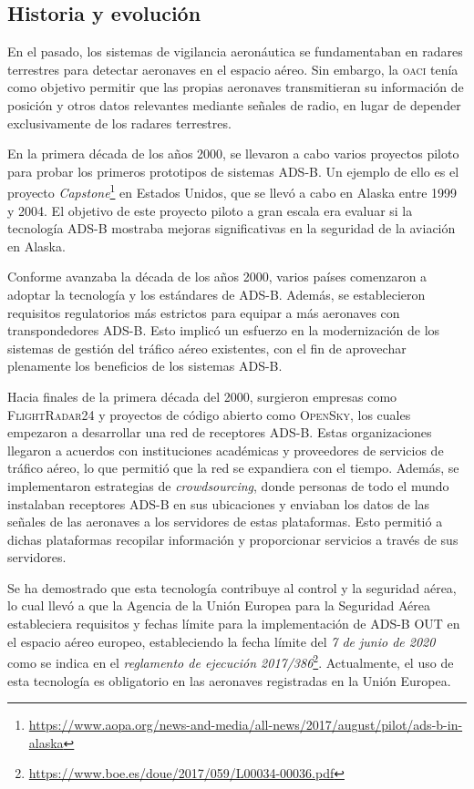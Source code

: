 \documentclass[a4paper, 11pt]{book}
\begin{document}
\subsection{Historia y evolución}
En el pasado, los sistemas de vigilancia aeronáutica se fundamentaban en radares terrestres para detectar aeronaves en el espacio aéreo. Sin embargo, la \textsc{\gls{oaci}} tenía como objetivo permitir que las propias aeronaves transmitieran su información de posición y otros datos relevantes mediante señales de radio, en lugar de depender exclusivamente de los radares terrestres.

En la primera década de los años 2000, se llevaron a cabo varios proyectos piloto para probar los primeros prototipos de sistemas \textsc{ADS-B}. Un ejemplo de ello es el proyecto \emph{Capstone}\footnote{\url{https://www.aopa.org/news-and-media/all-news/2017/august/pilot/ads-b-in-alaska}} en Estados Unidos, que se llevó a cabo en Alaska entre 1999 y 2004. El objetivo de este proyecto piloto a gran escala era evaluar si la tecnología \textsc{ADS-B} mostraba mejoras significativas en la seguridad de la aviación en Alaska.

Conforme avanzaba la década de los años 2000, varios países comenzaron a adoptar la tecnología y los estándares de \textsc{ADS-B}. Además, se establecieron requisitos regulatorios más estrictos para equipar a más aeronaves con transpondedores \textsc{ADS-B}. Esto implicó un esfuerzo en la modernización de los sistemas de gestión del tráfico aéreo existentes, con el fin de aprovechar plenamente los beneficios de los sistemas \textsc{ADS-B}.

Hacia finales de la primera década del 2000, surgieron empresas como \textsc{FlightRadar24} y proyectos de código abierto como \textsc{OpenSky}, los cuales empezaron a desarrollar una red de receptores \textsc{ADS-B}. Estas organizaciones llegaron a acuerdos con instituciones académicas y proveedores de servicios de tráfico aéreo, lo que permitió que la red se expandiera con el tiempo. 
Además, se implementaron estrategias de \emph{\gls{crowdsourcing}}, donde personas de todo el mundo instalaban receptores \textsc{ADS-B} en sus ubicaciones y enviaban los datos de las señales de las aeronaves a los servidores de estas plataformas. Esto permitió a dichas plataformas recopilar información y proporcionar servicios a través de sus servidores.

Se ha demostrado que esta tecnología contribuye al control y la seguridad aérea, lo cual llevó a que la Agencia de la Unión Europea para la Seguridad Aérea estableciera requisitos y fechas límite para la implementación de \textsc{ADS-B OUT} en el espacio aéreo europeo, estableciendo la fecha límite del \emph{7 de junio de 2020} como se indica en el \emph{reglamento de ejecución 2017/386}\footnote{\url{https://www.boe.es/doue/2017/059/L00034-00036.pdf}}. Actualmente, el uso de esta tecnología es obligatorio en las aeronaves registradas en la Unión Europea.
\end{document}
